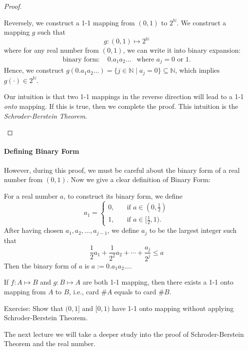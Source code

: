 \begin{proof}
\begin{enumerate}
Reversely, we construct a 1-1 mapping from $(0,1)$ to $2^{\mathbb{N}}$. We construct a mapping $g$ such that
\[
g:(0,1)\mapsto2^{\mathbb{N}}
\]
where for any real number from $(0,1)$, we can write it into binary expansion:
\[
\begin{array}{lll}
\mbox{binary form: }
&
0.a_1a_2\dots
&
\mbox{where }a_j=0\mbox{ or }1.
\end{array}
\]
Hence, we construct $g(0.a_1a_2\dots) = \{j\in\mathbb{N}\mid a_j=0\}\subseteq\mathbb{N}$, which implies $g(\cdot)\in2^{\mathbb{N}}$.
\begin{remark}
Our intuition is that two 1-1 mappings in the reverse direction will lead to a 1-1 \emph{onto} mapping. If this is true, then we complete the proof. This intuition is the \emph{Schroder-Berstein Theorem}.
\end{remark}
\end{enumerate}
\end{proof}
\paragraph{Defining Binary Form} However, during this proof, we must be careful about the binary form of a real number from $(0,1)$. Now we give a clear definition of Binary Form:

For a real number $a$, to construct its binary form, we define
\[
a_1=\left\{
\begin{aligned}
0,&\quad\mbox{if }a\in(0,\frac{1}{2})\\
1,&\quad\mbox{if }a\in[\frac{1}{2},1).
\end{aligned}
\right.
\]
After having chosen $a_1,a_2,\dots,a_{j-1}$, we define $a_j$ to be the largest integer such that
\[
\frac{1}{2}a_1+\frac{1}{2^2}a_2+\cdots+\frac{a_j}{2^j}\le a
\]
Then the binary form of $a$ is $a:=0.a_1a_2\dots$.
\begin{theorem}
If $f:A\mapsto B$ and $g:B\mapsto A$ are both 1-1 mapping, then there exists a 1-1 onto mapping from $A$ to $B$, i.e., card $\# A$ equals to card $\# B$.
\end{theorem}
Exercise: Show that $(0,1]$ and $[0,1)$ have 1-1 onto mapping without applying Schroder-Berstein Theorem.

The next lecture we will take a deeper study into the proof of Schroder-Berstein Theorem and the real number.













